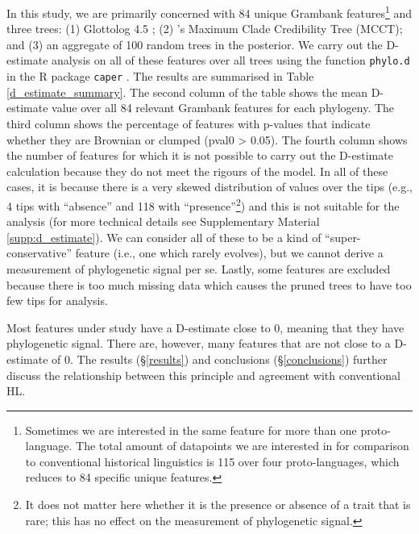 \documentclass[12pt,letterpaper]{article}
\begin{document}
In this study, we are primarily concerned with 84 unique Grambank features\footnote{Sometimes we are interested in the same feature for more than one proto-language. The total amount of datapoints we are interested in for comparison to conventional historical linguistics is 115 over four proto-languages, which reduces to 84 specific unique features.} and three trees: (1) Glottolog 4.5 \citep{glottolog4_5}; (2) \citet{grayetal_2009}'s Maximum Clade Credibility Tree (MCCT); and (3) an aggregate of 100 random trees in the \citet{grayetal_2009} posterior. We carry out the D-estimate analysis on all of these features over all trees using the function \texttt{phylo.d} in the R package \texttt{caper} \citep{orme2013caper}. The results are summarised in Table \ref{d_estimate_summary}. The second column of the table shows the mean D-estimate value over all 84 relevant Grambank features for each phylogeny. The third column shows the percentage of features with p-values that indicate whether they are Brownian or clumped (pval0 > 0.05). The fourth column shows the number of features for which it is not possible to carry out the D-estimate calculation because they do not meet the rigours of the model. In all of these cases, it is because there is a very skewed distribution of values over the tips (e.g., 4 tips with ``absence'' and 118 with ``presence''\footnote{It does not matter here whether it is the presence or absence of a trait that is rare; this has no effect on the measurement of phylogenetic signal.}) and this is not suitable for the analysis (for more technical details see Supplementary Material \ref{supp:d_estimate}). We can consider all of these to be a kind of ``super-conservative'' feature (i.e., one which rarely evolves), but we cannot derive a measurement of phylogenetic signal per se. Lastly, some features are excluded because there is too much missing data which causes the pruned trees to have too few tips for analysis.



Most features under study have a D-estimate close to 0, meaning that they have phylogenetic signal. There are, however, many features that are not close to a D-estimate of 0. The results (§\ref{results}) and conclusions  (§\ref{conclusions}) further discuss the relationship between this principle and agreement with conventional HL.
\end{document}
